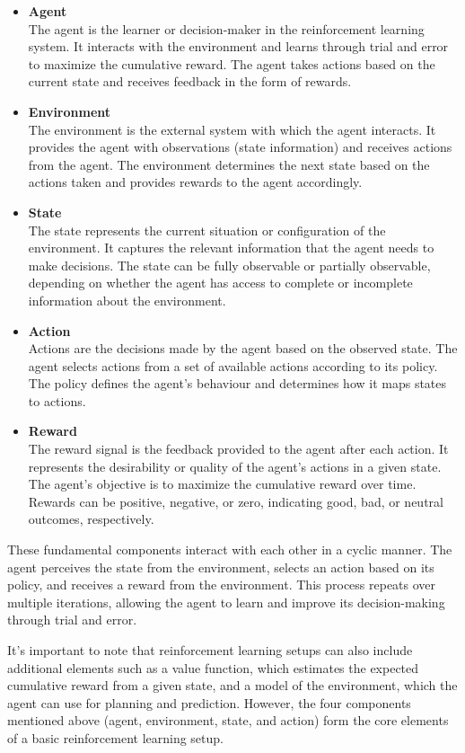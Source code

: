 \begin{itemize}

\item {\bf Agent}\\
The agent is the learner or decision-maker in the reinforcement learning system. It interacts with the environment and learns through trial and error to maximize the cumulative reward. The agent takes actions based on the current state and receives feedback in the form of rewards.

\item {\bf Environment}\\
The environment is the external system with which the agent interacts. It provides the agent with observations (state information) and receives actions from the agent. The environment determines the next state based on the actions taken and provides rewards to the agent accordingly.

\item {\bf State}\\
The state represents the current situation or configuration of the environment. It captures the relevant information that the agent needs to make decisions. The state can be fully observable or partially observable, depending on whether the agent has access to complete or incomplete information about the environment.

\item {\bf Action}\\
Actions are the decisions made by the agent based on the observed state. The agent selects actions from a set of available actions according to its policy. The policy defines the agent's behaviour and determines how it maps states to actions.

\item {\bf Reward}\\
The reward signal is the feedback provided to the agent after each action. It represents the desirability or quality of the agent's actions in a given state. The agent's objective is to maximize the cumulative reward over time. Rewards can be positive, negative, or zero, indicating good, bad, or neutral outcomes, respectively.

\end{itemize}


\begin{textblock}
These fundamental components interact with each other in a cyclic manner. The agent perceives the state from the environment, selects an action based on its policy, and receives a reward from the environment. This process repeats over multiple iterations, allowing the agent to learn and improve its decision-making through trial and error.

It's important to note that reinforcement learning setups can also include additional elements such as a value function, which estimates the expected cumulative reward from a given state, and a model of the environment, which the agent can use for planning and prediction. However, the four components mentioned above (agent, environment, state, and action) form the core elements of a basic reinforcement learning setup.
\end{textblock}

